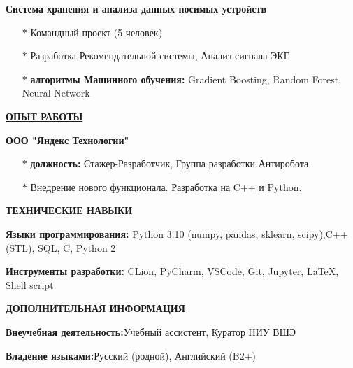 \documentclass[11pt]{article}
\begin{document}
\par \textbf{Система хранения и анализа данных носимых устройств}
\begin{itemize}
\item[$\ast$] Командный проект (5 человек)
\item[$\ast$] Разработка Рекомендательной системы, Анализ сигнала ЭКГ
\item[$\ast$] \textbf{алгоритмы Машинного обучения:} Gradient Boosting, Random Forest, Neural Network
\end{itemize}

\noindent \textbf{\underline{ОПЫТ РАБОТЫ}} \\
\par \textbf{ООО "Яндекс Технологии"}
\begin{itemize}
    \item[$\ast$] \textbf{должность:} Стажер-Разработчик, Группа разработки Антиробота
    \item[$\ast$] Внедрение нового функционала. Разработка на C++ и Python. 
\end{itemize}

\noindent \textbf{\underline{ТЕХНИЧЕСКИЕ НАВЫКИ}}\\
 \par \textbf{Языки программирования:} \hfill Python 3.10 (numpy, pandas, sklearn, scipy),C++ (STL), SQL, C, Python 2\\
\par \textbf{Инструменты разработки:} \hfill CLion, PyCharm, VSCode, Git, Jupyter, \LaTeX{}, Shell script

\noindent \textbf{\underline{ДОПОЛНИТЕЛЬНАЯ ИНФОРМАЦИЯ}} \\
\par \textbf{Внеучебная деятельность:}\hfill Учебный ассистент, Куратор НИУ ВШЭ \\
\par \textbf{Владение языками:}\hfill Русский (родной), Английский (B2+)
\end{document}
